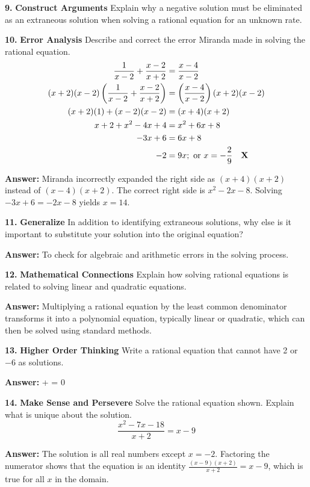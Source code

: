 \documentclass{article}
\newenvironment{practice}[2]{\textbf{#1.}}{\vspace{1em}}
\newcommand{\answer}[1]{\par\textbf{Answer:} #1}
\begin{document}
\begin{practice}{9}{DOK}
\textbf{Construct Arguments} Explain why a negative solution must be eliminated as an extraneous solution when solving a rational equation for an unknown rate.
\end{practice}

\begin{practice}{10}{DOK}
\textbf{Error Analysis} Describe and correct the error Miranda made in solving the rational equation.
\begin{align*}
\frac{1}{x-2} + \frac{x-2}{x+2} &= \frac{x-4}{x-2} \\
(x+2)(x-2)\left(\frac{1}{x-2} + \frac{x-2}{x+2}\right) &= \left(\frac{x-4}{x-2}\right)(x+2)(x-2) \\
(x+2)(1) + (x-2)(x-2) &= (x+4)(x+2) \\
x + 2 + x^2 - 4x + 4 &= x^2 + 6x + 8 \\
-3x + 6 &= 6x + 8 \\
-2 &= 9x; \text{ or } x = -\frac{2}{9} \quad \text{\textbf{X}}
\end{align*}
\answer{Miranda incorrectly expanded the right side as $(x+4)(x+2)$ instead of $(x-4)(x+2)$. The correct right side is $x^2 - 2x - 8$. Solving $-3x + 6 = -2x - 8$ yields $x = 14$.}
\end{practice}

\begin{practice}{11}{DOK}
\textbf{Generalize} In addition to identifying extraneous solutions, why else is it important to substitute your solution into the original equation?
\answer{To check for algebraic and arithmetic errors in the solving process.}
\end{practice}

\begin{practice}{12}{DOK}
\textbf{Mathematical Connections} Explain how solving rational equations is related to solving linear and quadratic equations.
\answer{Multiplying a rational equation by the least common denominator transforms it into a polynomial equation, typically linear or quadratic, which can then be solved using standard methods.}
\end{practice}

\begin{practice}{13}{DOK}
\textbf{Higher Order Thinking} Write a rational equation that cannot have 2 or $-6$ as solutions.
\answer{  +  = 0}
\end{practice}

\begin{practice}{14}{DOK}
\textbf{Make Sense and Persevere} Solve the rational equation shown. Explain what is unique about the solution.
\[ \frac{x^2 - 7x - 18}{x+2} = x - 9 \]
\answer{The solution is all real numbers except $x = -2$. Factoring the numerator shows that the equation is an identity $\frac{(x-9)(x+2)}{x+2} = x-9$, which is true for all $x$ in the domain.}
\end{practice}
\end{document}
